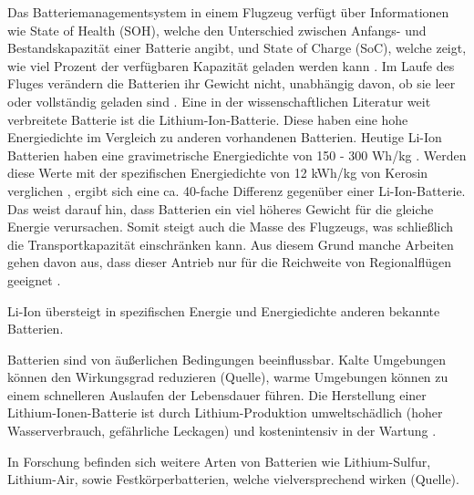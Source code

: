 Das Batteriemanagementsystem in einem Flugzeug verfügt über Informationen wie State of Health (SOH), welche den Unterschied zwischen Anfangs-
und Bestandskapazität einer Batterie angibt, und State of Charge (SoC), welche zeigt, wie viel Prozent der verfügbaren Kapazität geladen werden kann \cite{donckers2024electric}.
Im Laufe des Fluges verändern die Batterien ihr Gewicht nicht, unabhängig davon, ob sie leer oder vollständig geladen sind \cite{donckers2024electric}. 
Eine in der wissenschaftlichen Literatur weit verbreitete Batterie ist die Lithium-Ion-Batterie. Diese haben eine hohe Energiedichte im Vergleich zu anderen vorhandenen Batterien. %
Heutige Li-Ion Batterien haben eine gravimetrische Energiedichte von 150 - 300 Wh/kg \cite{colpan2022fuel}. Werden diese Werte mit der spezifischen Energiedichte von 12 kWh/kg von Kerosin verglichen \cite{dalmia2022powering},
ergibt sich eine ca. 40-fache Differenz gegenüber einer Li-Ion-Batterie. Das weist darauf hin, dass Batterien ein viel höheres Gewicht für die gleiche Energie verursachen. 
Somit steigt auch die Masse des Flugzeugs, was schließlich die Transportkapazität einschränken kann. 
Aus diesem Grund manche Arbeiten gehen davon aus, dass dieser Antrieb nur für die Reichweite von Regionalflügen geeignet \cite{abrantes2024impact}.

Li-Ion übersteigt in spezifischen Energie und Energiedichte anderen bekannte Batterien.%

Batterien sind von äußerlichen Bedingungen beeinflussbar. Kalte Umgebungen können 
den Wirkungsgrad reduzieren (Quelle), warme Umgebungen können zu einem schnelleren Auslaufen der Lebensdauer führen. 
Die Herstellung einer Lithium-Ionen-Batterie ist durch Lithium-Produktion umweltschädlich (hoher Wasserverbrauch, gefährliche Leckagen) und 
kostenintensiv in der Wartung \cite{dalmia2022powering}. 

In Forschung befinden sich weitere Arten von Batterien wie Lithium-Sulfur, Lithium-Air, sowie Festkörperbatterien, welche vielversprechend wirken (Quelle).
%
%


